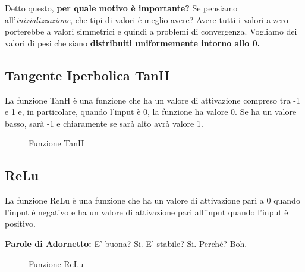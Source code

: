 Detto questo, \textbf{per quale motivo è importante?} Se pensiamo
all'\textit{inizializzazione}, che tipi di valori è meglio avere? Avere tutti i
valori a zero porterebbe a valori simmetrici e quindi a problemi di
convergenza. Vogliamo dei valori di pesi che siano \textbf{distribuiti
    uniformemente intorno allo 0.}

\subsection{Tangente Iperbolica TanH}

La funzione TanH è una funzione che ha un valore di attivazione compreso tra -1
e 1 e, in particolare, quando l'input è 0, la funzione ha valore 0. Se ha un
valore basso, sarà -1 e chiaramente se sarà alto avrà valore 1.

\begin{figure}[H]
    \begin{center}
    \end{center}
    \caption{Funzione TanH}
\end{figure}

\subsection{ReLu}

La funzione ReLu è una funzione che ha un valore di attivazione pari a 0 quando
l'input è negativo e ha un valore di attivazione pari all'input quando l'input
è positivo.

\textbf{Parole di Adornetto:} E' buona? Si. E' stabile? Si. Perché? Boh.

\begin{figure}[H]
    \begin{center}
    \end{center}
    \caption{Funzione ReLu}
\end{figure}

